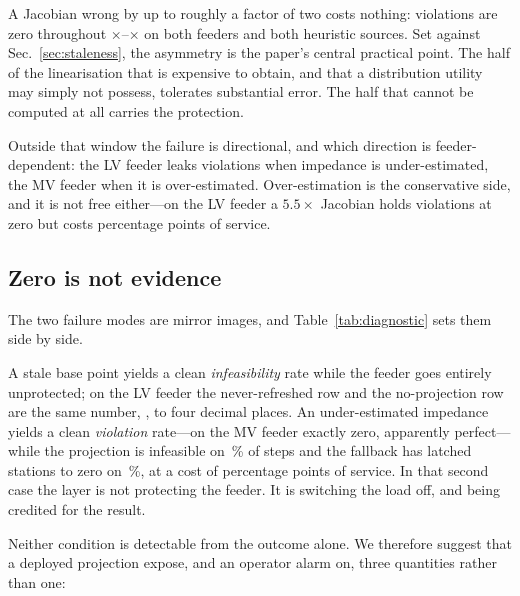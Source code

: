 \documentclass[conference,a4paper]{IEEEtran}
\begin{document}
A Jacobian wrong by up to roughly a factor of two costs nothing: violations are
zero throughout \nSafeLo$\times$--\nSafeHi$\times$ on both feeders and both
heuristic sources. Set against Sec.~\ref{sec:staleness}, the asymmetry is the
paper's central practical point. The half of the linearisation that is expensive
to obtain, and that a distribution utility may simply not possess, tolerates
substantial error. The half that cannot be computed at all carries the
protection.

Outside that window the failure is directional, and which direction is
feeder-dependent: the LV feeder leaks violations when impedance is
under-estimated, the MV feeder when it is over-estimated. Over-estimation is the
conservative side, and it is not free either---on the LV feeder a
$5.5\times$ Jacobian holds violations at zero but costs \nLvOverServiceLoss{}
percentage points of service.

\subsection{Zero is not evidence}
\label{sec:diagnostic}

The two failure modes are mirror images, and Table~\ref{tab:diagnostic} sets them
side by side.

\begin{table}[!t]
\caption{Two Failure Modes. Neither Shows in the Column an Operator Watches.}
\label{tab:diagnostic}
\centering\footnotesize\setlength{\tabcolsep}{3pt}

\end{table}

A stale base point yields a clean \emph{infeasibility} rate while the feeder goes
entirely unprotected; on the LV feeder the never-refreshed row and the
no-projection row are the same number, \nLvStaleViol{}, to four decimal places.
An under-estimated impedance yields a clean \emph{violation} rate---on the MV
feeder exactly zero, apparently perfect---while the projection is infeasible on
\nMvUnderInfeas\,\% of steps and the fallback has latched stations to zero on
\nMvUnderFrozen\,\%, at a cost of \nMvUnderServiceLoss{} percentage points of
service. In that second case the layer is not protecting the feeder. It is
switching the load off, and being credited for the result.

Neither condition is detectable from the outcome alone. We therefore suggest that
a deployed projection expose, and an operator alarm on, three quantities rather
than one:
\end{document}
